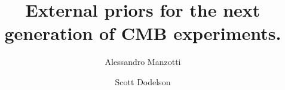 \documentclass[aps,prd,preprint,groupedaddress]{revtex4-1}
\begin{document}
\graphicspath{{images/}}

\title{External priors for the next generation of CMB experiments.}

\author{Alessandro Manzotti}
\author{Scott Dodelson}
\end{document}
